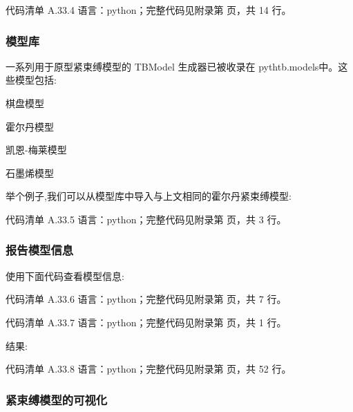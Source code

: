 \documentclass[lang=cn,scheme=chinese,color=blue,device=normal,toc=onecol,math=cm]{elegantbook}
\begin{document}
\begin{codeindexbox}{代码清单 A.33.4}
语言：python；完整代码见附录第 \pageref{code:33:4} 页，共 14 行。
\end{codeindexbox}


\subsubsection{模型库}


一系列用于原型紧束缚模型的 TBModel 生成器已被收录在 pythtb.models中。这些模型包括:\par


棋盘模型\par


霍尔丹模型\par


凯恩-梅莱模型\par


石墨烯模型\par


举个例子,我们可以从模型库中导入与上文相同的霍尔丹紧束缚模型:\par


\begin{codeindexbox}{代码清单 A.33.5}
语言：python；完整代码见附录第 \pageref{code:33:5} 页，共 3 行。
\end{codeindexbox}


\subsubsection{报告模型信息}


使用下面代码查看模型信息:\par


\begin{codeindexbox}{代码清单 A.33.6}
语言：python；完整代码见附录第 \pageref{code:33:6} 页，共 7 行。
\end{codeindexbox}


\begin{codeindexbox}{代码清单 A.33.7}
语言：python；完整代码见附录第 \pageref{code:33:7} 页，共 1 行。
\end{codeindexbox}


结果:\par


\begin{codeindexbox}{代码清单 A.33.8}
语言：python；完整代码见附录第 \pageref{code:33:8} 页，共 52 行。
\end{codeindexbox}


\subsubsection{紧束缚模型的可视化}
\end{document}
